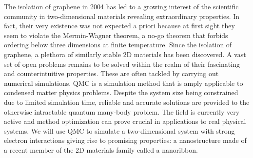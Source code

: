 
\label{cap:int}

\slshape

The isolation of graphene in 2004 has led to a growing interest of the scientific community in two-dimensional materials revealing extraordinary properties. In fact, their very existence was not expected a priori because at first sight they seem to violate the Mermin-Wagner theorem, a no-go theorem that forbids ordering below three dimensions at finite temperature. Since the isolation of graphene, a plethora of similarly stable 2D materials has been discovered. A vast set of open problems remains to be solved within the realm of their fascinating and counterintuitive properties. These are often tackled by carrying out numerical simulations. \ac{QMC} is a simulation method that is amply applicable to condensed matter physics problems. Despite the system size being constrained due to limited simulation time, reliable and accurate solutions are provided to the otherwise intractable quantum many-body problem. The field is currently very active and method optimization can prove crucial in applications to real physical systems. We will use \acs{QMC} to simulate a two-dimensional system with strong electron interactions giving rise to promising properties: a nanostructure made of a recent member of the 2D materials family called a nanoribbon.

\normalfont







\cleardoublepage
